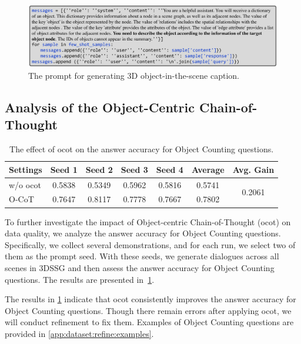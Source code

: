 \begin{figure}[t!]
\centering
\includegraphics[width=\textwidth, keepaspectratio]{figs/prompt_object_caption.pdf}%
  \caption{The prompt for generating 3D object-in-the-scene caption. }
  \label{fig:prompt:object_caption}
\end{figure}

\subsection{Analysis of the Object-Centric Chain-of-Thought}\label{app:dataset:ocot}
\begin{table}[t!]
    \centering
    \small
    \caption{The effect of \ac{ocot} on the answer accuracy for Object Counting questions.}
    \begin{tabular}{l|c c c c c c }
        \toprule
        \textbf{Settings} & \textbf{Seed 1} & \textbf{Seed 2} & \textbf{Seed 3} & \textbf{Seed 4} & \textbf{Average} & \textbf{Avg. Gain} \\
        \midrule
        w/o \ac{ocot} & 0.5838 & 0.5349 & 0.5962 & 0.5816 & 0.5741 & \multirow{2}[2]{*}{0.2061}\\
        \cmidrule{1-6}
        O-CoT & 0.7647 & 0.8117 & 0.7778 & 0.7667 & 0.7802 \\
        \bottomrule
    \end{tabular}
    \label{tab:ocot_ablation}
\end{table}
To further investigate the impact of Object-centric Chain-of-Thought (\ac{ocot}) on data quality, we analyze the answer accuracy for Object Counting questions. Specifically, we collect several demonstrations, and for each run, we select two of them as the prompt seed. With these seeds, we generate dialogues across all scenes in 3DSSG \citep{wu2021scenegraphfusion} and then assess the answer accuracy for Object Counting questions. The results are presented in~\cref{tab:ocot_ablation}.


The results in \cref{tab:ocot_ablation} indicate that \ac{ocot} consistently improves the answer accuracy for Object Counting questions. Though there remain errors after applying \ac{ocot}, we will conduct refinement to fix them. Examples of Object Counting questions are provided in \cref{app:dataset:refine:examples}. 


